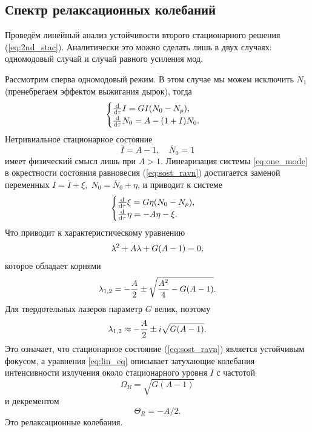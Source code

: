 \documentclass[12pt]{article}
\begin{document}
	\subsection{Спектр релаксационных колебаний}

	Проведём линейный анализ устойчивости второго стационарного решения (\ref{eq:2nd_stac}). Аналитически это можно сделать лишь в двух случаях: одномодовый случай и случай равного усиления мод.

	Рассмотрим сперва одномодовый режим. В этом случае мы можем исключить $N_1$ (пренебрегаем эффектом выжигания дырок), тогда 
	\begin{equation}\label{eq:one_mode}
		\begin{cases}
			\dv{\tau} I = G I \qty(N_0 - N_p),\\
			\dv{\tau} N_0 = A - \qty(1 + I)N_0.			
		\end{cases}
	\end{equation}
	Нетривиальное стационарное состояние
	\begin{equation}\label{eq:sost_ravn}
		\overline{I} = A-1,\quad \overline{N}_0 = 1
	\end{equation}
	имеет физический смысл лишь при $A>1$. Линеаризация системы \ref{eq:one_mode} в окрестности состояния равновесия (\ref{eq:sost_ravn}) достигается заменой переменных $I = \overline{I} + \xi,\; N_0 = \overline{N}_0 + \eta$, и приводит к системе
	\begin{equation}\label{eq:lin_eq}
		\begin{cases}
			\dv{\tau} \xi = G \eta \qty(N_0 - N_p),\\
			\dv{\tau} \eta = -A\eta-\xi.			
		\end{cases}
	\end{equation}
	Что приводит к характеристическому уравнению
	\begin{equation}
		\lambda^2 + A\lambda + G\qty(A-1)=0,
	\end{equation}
	которое обладает корнями
	\begin{equation}
		\lambda_{1,2} = -\dfrac{A}{2} \pm \sqrt{\dfrac{A^2}{4} - G\qty(A-1)}.
	\end{equation}
	Для твердотельных лазеров параметр $G$ велик, поэтому
	\begin{equation}
		\lambda_{1,2} \approx -\dfrac{A}{2} \pm i \sqrt{G\qty(A-1)}.
	\end{equation}
	Это означает, что стационарное состояние (\ref{eq:sost_ravn}) является устойчивым фокусом, а уравнения \ref{eq:lin_eq} описывает затухающие колебания интенсивности излучения около стационарного уровня $\overline{I}$ с частотой
	\begin{equation}
	 	\Omega_R = \sqrt{G(A-1)}
	\end{equation}
	и декрементом 
	\begin{equation}
		\Theta_R = - A/2.
	\end{equation}
	Это релаксационные колебания.
\end{document}
